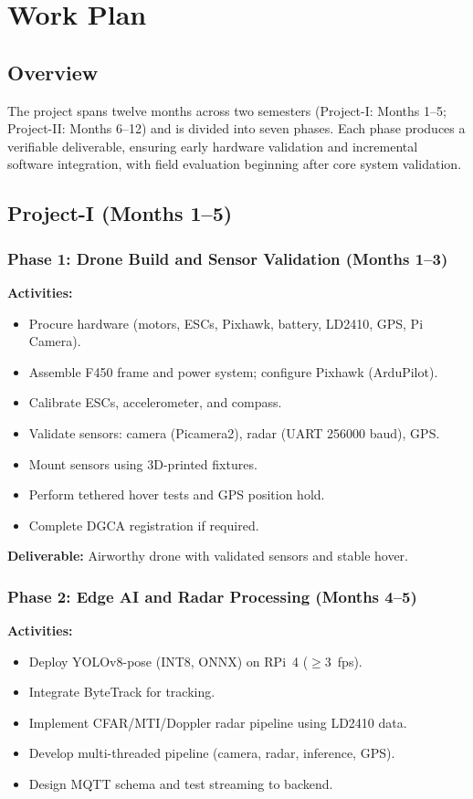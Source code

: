 \chapter{Work Plan}
\label{Work_Plan}

\section{Overview}
The project spans twelve months across two semesters (Project-I: Months 1--5; Project-II: Months 6--12) and is divided into seven phases. Each phase produces a verifiable deliverable, ensuring early hardware validation and incremental software integration, with field evaluation beginning after core system validation.

\section{Project-I (Months 1--5)}

\subsection{Phase 1: Drone Build and Sensor Validation (Months 1--3)}

\textbf{Activities:}
\begin{itemize}
    \item Procure hardware (motors, ESCs, Pixhawk, battery, LD2410, GPS, Pi Camera).
    \item Assemble F450 frame and power system; configure Pixhawk (ArduPilot).
    \item Calibrate ESCs, accelerometer, and compass.
    \item Validate sensors: camera (Picamera2), radar (UART 256000 baud), GPS.
    \item Mount sensors using 3D-printed fixtures.
    \item Perform tethered hover tests and GPS position hold.
    \item Complete DGCA registration if required.
\end{itemize}

\textbf{Deliverable:} Airworthy drone with validated sensors and stable hover.

\subsection{Phase 2: Edge AI and Radar Processing (Months 4--5)}

\textbf{Activities:}
\begin{itemize}
    \item Deploy YOLOv8-pose (INT8, ONNX) on RPi~4 ($\geq$3~fps).
    \item Integrate ByteTrack for tracking.
    \item Implement CFAR/MTI/Doppler radar pipeline using LD2410 data.
    \item Develop multi-threaded pipeline (camera, radar, inference, GPS).
    \item Design MQTT schema and test streaming to backend.
\end{itemize}

